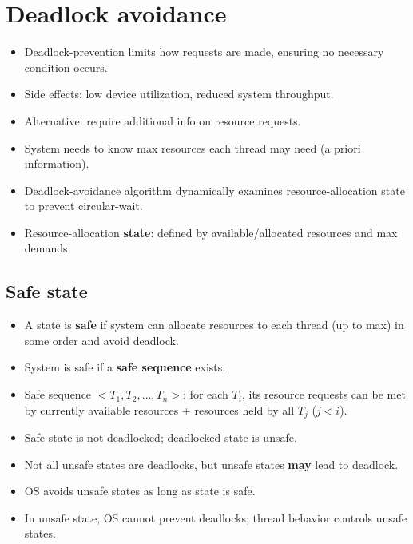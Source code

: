 \section{Deadlock avoidance}

\begin{itemize}[noitemsep, topsep=0pt]
    \item Deadlock-prevention limits how requests are made, ensuring no necessary condition occurs.
    \item Side effects: low device utilization, reduced system throughput.
    \item Alternative: require additional info on resource requests.
    \item System needs to know max resources each thread may need (a priori information).
    \item Deadlock-avoidance algorithm dynamically examines resource-allocation state to prevent circular-wait.
    \item Resource-allocation \textbf{state}: defined by available/allocated resources and max demands.
\end{itemize}

\subsection*{Safe state}
\begin{itemize}[noitemsep, topsep=0pt]
    \item A state is \textbf{safe} if system can allocate resources to each thread (up to max) in some order and avoid deadlock.
    \item System is safe if a \textbf{safe sequence} exists.
    \item Safe sequence $<T_1, T_2, \dots, T_n>$: for each $T_i$, its resource requests can be met by currently available resources + resources held by all $T_j$ ($j < i$).
    \item Safe state is not deadlocked; deadlocked state is unsafe.
    \item Not all unsafe states are deadlocks, but unsafe states \textbf{may} lead to deadlock.
    \item OS avoids unsafe states as long as state is safe.
    \item In unsafe state, OS cannot prevent deadlocks; thread behavior controls unsafe states.
\end{itemize}

